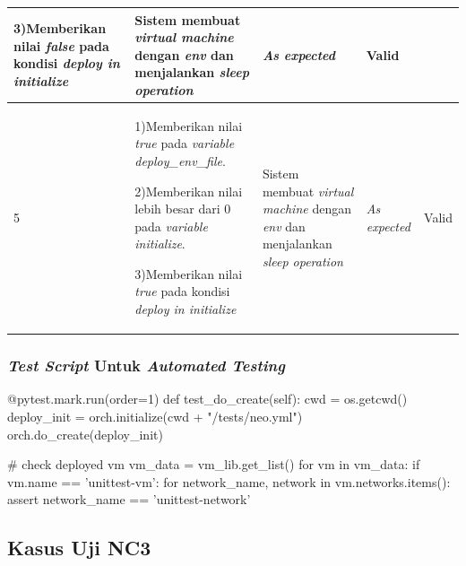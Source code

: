 \begin{longtable}{|P{.06\textwidth}|P{.30\textwidth}|P{.30\textwidth}|P{.10\textwidth}|P{.08\textwidth}|}
      3)Memberikan nilai \emph{false} pada kondisi \emph{deploy in initialize}
                                             & Sistem membuat
                                               \emph{virtual machine} dengan \emph{env} dan menjalankan
                                               \emph{sleep operation} & \emph{As expected} & Valid \\\hline
  5 & 1)Memberikan nilai \emph{true} pada \emph{variable deploy\_env\_file}. \par\null\par
      2)Memberikan nilai lebih besar dari 0 pada \emph{variable initialize}. \par\null\par
      3)Memberikan nilai \emph{true} pada kondisi \emph{deploy in initialize}
                                             & Sistem membuat
                                               \emph{virtual machine} dengan \emph{env} dan menjalankan
                                               \emph{sleep operation} & \emph{As expected} & Valid \\\hline
\end{longtable}

\subsubsection{\emph{Test Script} Untuk \emph{Automated Testing}}

\begin{code}
\begin{ignasicblock}[title=test\_do\_create,minted language=Python]
@pytest.mark.run(order=1)
def test_do_create(self):
    cwd = os.getcwd()
    deploy_init = orch.initialize(cwd + "/tests/neo.yml")
    orch.do_create(deploy_init)

    # check deployed vm
    vm_data = vm_lib.get_list()
    for vm in vm_data:
        if vm.name == 'unittest-vm':
            for network_name, network in vm.networks.items():
                assert network_name == 'unittest-network'
\end{ignasicblock}
\label{ts:create-vm-f}
\end{code}


\subsection{Kasus Uji NC3}

